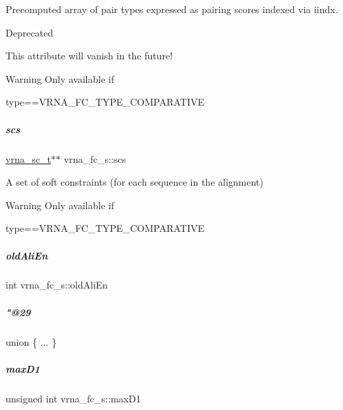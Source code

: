 Precomputed array of pair types expressed as pairing scores indexed via iindx. 

\begin{DoxyRefDesc}{Deprecated}
\item[\mbox{\hyperlink{deprecated__deprecated000084}{Deprecated}}]This attribute will vanish in the future! \end{DoxyRefDesc}
\begin{DoxyWarning}{Warning}
Only available if\begin{DoxyVerb}type==VRNA_FC_TYPE_COMPARATIVE \end{DoxyVerb}
 
\end{DoxyWarning}
\mbox{\label{group__fold__compound_ac2b047fddabc51a76a96511174e47db1}} 
\subparagraph{\texorpdfstring{scs}{scs}}
{\footnotesize\ttfamily \mbox{\hyperlink{group__soft__constraints_ga75401ce219ef8dbcceb672db82d434c6}{vrna\+\_\+sc\+\_\+t}}$\ast$$\ast$ vrna\+\_\+fc\+\_\+s\+::scs}



A set of soft constraints (for each sequence in the alignment) 

\begin{DoxyWarning}{Warning}
Only available if\begin{DoxyVerb}type==VRNA_FC_TYPE_COMPARATIVE \end{DoxyVerb}
 
\end{DoxyWarning}
\mbox{\label{group__fold__compound_ac539df9233472dd76d070f4a821185a9}} 
\subparagraph{\texorpdfstring{old\+Ali\+En}{oldAliEn}}
{\footnotesize\ttfamily int vrna\+\_\+fc\+\_\+s\+::old\+Ali\+En}

\mbox{\label{group__fold__compound_ab172ac3b4bdd7448d7f6c112850081bc}} 
\subparagraph{\texorpdfstring{"@29}{@29}}
{\footnotesize\ttfamily union \{ ... \} }

\mbox{\label{group__fold__compound_a426305721b16023f2f3247f7354d2c46}} 
\subparagraph{\texorpdfstring{max\+D1}{maxD1}}
{\footnotesize\ttfamily unsigned int vrna\+\_\+fc\+\_\+s\+::max\+D1}




